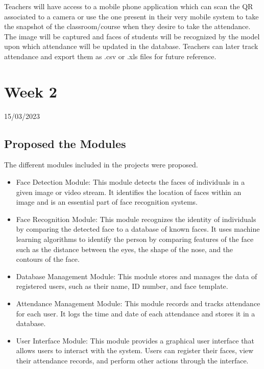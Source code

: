 \documentclass[12pt]{book}
\begin{document}
    Teachers will have access to a mobile phone application
    which can scan the QR associated to a camera or use the one
    present in their very mobile system to take the snapshot of
    the classroom/course when they desire to take the
    attendance. The image will be captured and faces of students
    will be recognized by the model upon which attendance will
    be updated in the database. Teachers can later track
    attendance and export them as .csv or .xls files for future
    reference.
    
    \chapter{Week 2}
    \justifying
    \large
    15/03/2023 \\[10pt]
    
    \paragraph{}
    \section{Proposed the Modules}
    The different modules included in the projects were proposed.
    
	\begin{itemize}
		
		\item Face Detection Module: This module detects the faces of individuals in a given image or video stream. It identifies the location of faces within an image and is an essential part of face recognition systems.
		
		\item Face Recognition Module: This module recognizes the identity of individuals by comparing the detected face to a database of known faces. It uses machine learning algorithms to identify the person by comparing features of the face such as the distance between the eyes, the shape of the nose, and the contours of the face.
		
		\item Database Management Module: This module stores and manages the data of registered users, such as their name, ID number, and face template.
		
		\item Attendance Management Module: This module records and tracks attendance for each user. It logs the time and date of each attendance and stores it in a database.
		
		\item User Interface Module: This module provides a graphical user interface that allows users to interact with the system. Users can register their faces, view their attendance records, and perform other actions through the interface.
		
	\end{itemize}
\end{document}
